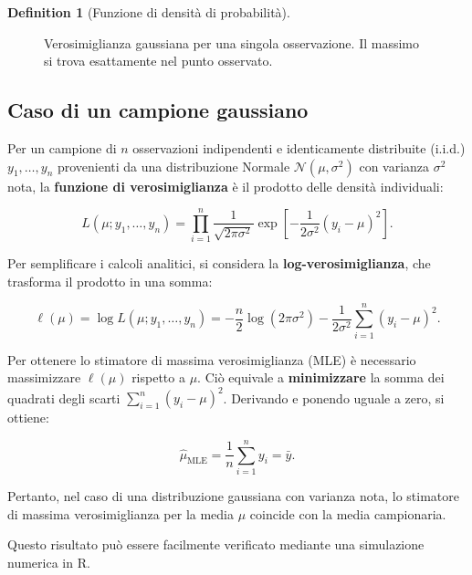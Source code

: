 \documentclass[
  letterpaper,
  DIV=11,
  numbers=noendperiod,
  oneside]{scrreprt}
\theoremstyle{definition}
\theoremstyle{plain}
\theoremstyle{definition}
\newtheorem{definition}{Definition}[chapter]
\theoremstyle{remark}
\begin{document}
\begin{definition}[Funzione di densità di
probabilità]
\begin{figure}[H]
{}

\caption{\label{fig-normal-lik-single}Verosimiglianza gaussiana per una
singola osservazione. Il massimo si trova esattamente nel punto
osservato.}

\end{figure}%

\subsection{Caso di un campione
gaussiano}\label{caso-di-un-campione-gaussiano}

Per un campione di \(n\) osservazioni indipendenti e identicamente
distribuite (i.i.d.) \(y_1, \ldots, y_n\) provenienti da una
distribuzione Normale \(\mathcal{N}(\mu, \sigma^2)\) con varianza
\(\sigma^2\) nota, la \textbf{funzione di verosimiglianza} è il prodotto
delle densità individuali:

\[
L(\mu; y_1, \ldots, y_n) = \prod_{i=1}^n \frac{1}{\sqrt{2\pi\sigma^2}} \exp\left[-\frac{1}{2\sigma^2}(y_i - \mu)^2\right].
\]

Per semplificare i calcoli analitici, si considera la
\textbf{log-verosimiglianza}, che trasforma il prodotto in una somma:

\[
\ell(\mu) = \log L(\mu; y_1, \ldots, y_n) = -\frac{n}{2}\log(2\pi\sigma^2) - \frac{1}{2\sigma^2}\sum_{i=1}^n (y_i - \mu)^2.
\]

Per ottenere lo stimatore di massima verosimiglianza (MLE) è necessario
massimizzare \(\ell(\mu)\) rispetto a \(\mu\). Ciò equivale a
\textbf{minimizzare} la somma dei quadrati degli scarti
\(\sum_{i=1}^n (y_i - \mu)^2\). Derivando e ponendo uguale a zero, si
ottiene:

\[
\hat{\mu}_{\text{MLE}} = \frac{1}{n} \sum_{i=1}^n y_i = \bar{y}.
\]

Pertanto, nel caso di una distribuzione gaussiana con varianza nota, lo
stimatore di massima verosimiglianza per la media \(\mu\) coincide con
la media campionaria.

Questo risultato può essere facilmente verificato mediante una
simulazione numerica in R.


\end{definition}
\end{document}
